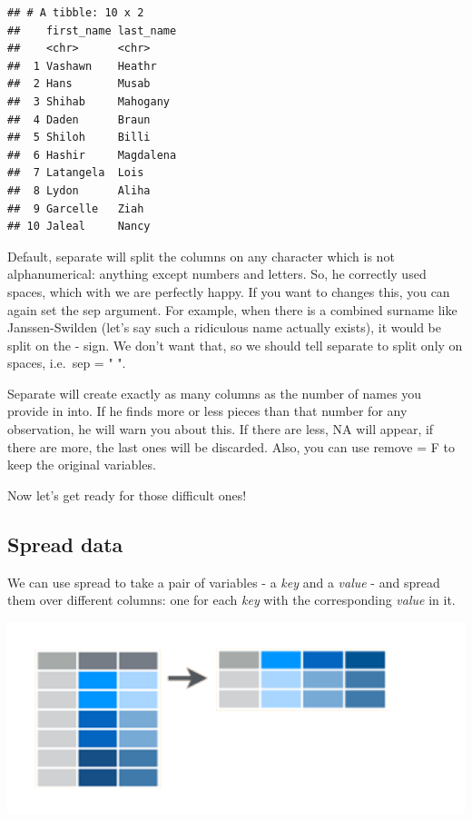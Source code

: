 \documentclass[]{tufte-book}
\newenvironment{Shaded}{}{}
\newcommand{\DataTypeTok}[1]{\textcolor[rgb]{0.56,0.13,0.00}{#1}}
\newcommand{\DecValTok}[1]{\textcolor[rgb]{0.25,0.63,0.44}{#1}}
\newcommand{\KeywordTok}[1]{\textcolor[rgb]{0.00,0.44,0.13}{\textbf{#1}}}
\newcommand{\NormalTok}[1]{#1}
\newcommand{\OperatorTok}[1]{\textcolor[rgb]{0.40,0.40,0.40}{#1}}
\newcommand{\StringTok}[1]{\textcolor[rgb]{0.25,0.44,0.63}{#1}}
\begin{document}
\begin{Shaded}
\end{Shaded}

\begin{verbatim}
## # A tibble: 10 x 2
##    first_name last_name
##    <chr>      <chr>    
##  1 Vashawn    Heathr   
##  2 Hans       Musab    
##  3 Shihab     Mahogany 
##  4 Daden      Braun    
##  5 Shiloh     Billi    
##  6 Hashir     Magdalena
##  7 Latangela  Lois     
##  8 Lydon      Aliha    
##  9 Garcelle   Ziah     
## 10 Jaleal     Nancy
\end{verbatim}

Default, separate will split the columns on any character which is not alphanumerical: anything except numbers and letters. So, he correctly used spaces, which with we are perfectly happy. If you want to changes this, you can again set the sep argument. For example, when there is a combined surname like Janssen-Swilden (let's say such a ridiculous name actually exists), it would be split on the - sign. We don't want that, so we should tell separate to split only on spaces, i.e.~sep = " ".

Separate will create exactly as many columns as the number of names you provide in into. If he finds more or less pieces than that number for any observation, he will warn you about this. If there are less, NA will appear, if there are more, the last ones will be discarded. Also, you can use remove = F to keep the original variables.

Now let's get ready for those difficult ones!

\hypertarget{spread-data}{%
\subsection{Spread data}\label{spread-data}}

We can use spread to take a pair of variables - a \emph{key} and a \emph{value} - and spread them over different columns: one for each \emph{key} with the corresponding \emph{value} in it.

\includegraphics[width=1\linewidth]{images/spread}
\end{document}
